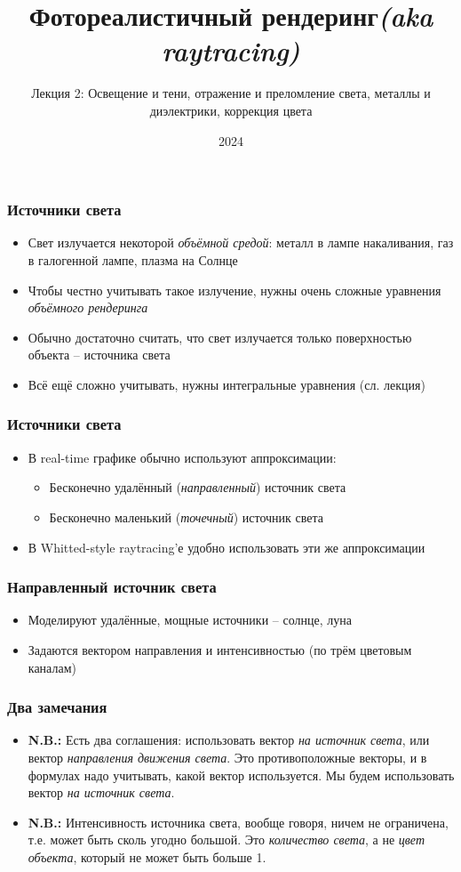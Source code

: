 \documentclass[10pt]{beamer}
\title{Фотореалистичный рендеринг\quad\quad\quad\quad\quad\quad \textit{(aka raytracing)}}
\subtitle{Лекция 2: Освещение и тени, отражение и преломление света, металлы и диэлектрики, коррекция цвета}
\date{2024}
\begin{document}
\frame{\titlepage}

\begin{frame}
\frametitle{Источники света}
\begin{itemize}
\item Свет излучается некоторой \textit{объёмной средой}: металл в лампе накаливания, газ в галогенной лампе, плазма на Солнце
\pause
\item Чтобы честно учитывать такое излучение, нужны очень сложные уравнения \textit{объёмного рендеринга}
\pause
\item Обычно достаточно считать, что свет излучается только поверхностью объекта -- источника света
\pause
\item Всё ещё сложно учитывать, нужны интегральные уравнения (сл. лекция)
\end{itemize}
\end{frame}

\begin{frame}
\frametitle{Источники света}
\begin{itemize}
\item В real-time графике обычно используют аппроксимации:
\pause
\begin{itemize}
\item Бесконечно удалённый (\textit{направленный}) источник света
\pause
\item Бесконечно маленький (\textit{точечный}) источник света
\end{itemize}
\pause
\item В Whitted-style raytracing'е удобно использовать эти же аппроксимации
\end{itemize}
\end{frame}

\begin{frame}[fragile]
\frametitle{Направленный источник света}
\begin{itemize}
\item Моделируют удалённые, мощные источники -- солнце, луна
\pause
\item Задаются вектором направления и интенсивностью (по трём цветовым каналам)
\end{itemize}
\end{frame}

\begin{frame}[fragile]
\frametitle{Два замечания}
\begin{itemize}
\item \textbf{\alert{N.B.:}} Есть два соглашения: использовать вектор \textit{на источник света}, или вектор \textit{направления движения света}. Это противоположные векторы, и в формулах надо учитывать, какой вектор используется. Мы будем использовать вектор \textit{на источник света}.
\pause
\item \textbf{\alert{N.B.:}} Интенсивность источника света, вообще говоря, ничем не ограничена, т.е. может быть сколь угодно большой. Это \textit{количество света}, а не \textit{цвет объекта}, который не может быть больше 1.
\end{itemize}
\end{frame}
\end{document}
